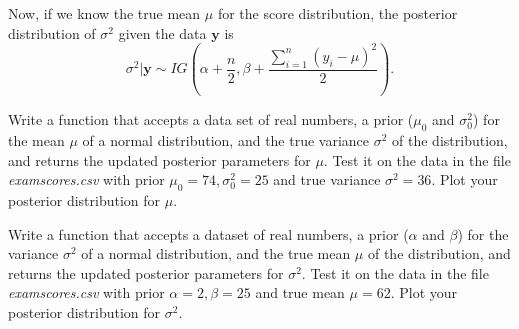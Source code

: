 Now, if we know the true mean $\mu$ for the score distribution, the posterior distribution of $\sigma^{2}$ given the data $\mathbf{y}$ is $$\sigma^{2} | \mathbf{y} \sim IG \left(\alpha + \frac{n}{2}, \beta + \frac{\sum_{i=1}^{n} (y_{i} - \mu)^{2}}{2}\right).$$

\begin{problem}
Write a function that accepts a data set of real numbers, a prior ($\mu_{0}$ and $\sigma_{0}^{2}$) for the mean $\mu$ of a normal distribution, and the true variance $\sigma^{2}$ of the distribution, and returns the updated posterior parameters for $\mu$. Test it on the data in the file \emph{examscores.csv} with prior $\mu_{0} = 74, \sigma_{0}^{2} = 25$ and true variance $\sigma^{2} = 36$. Plot your posterior distribution for $\mu$.
\end{problem}

\begin{problem}
Write a function that accepts a dataset of real numbers, a prior ($\alpha$ and $\beta$) for the variance $\sigma^{2}$ of a normal distribution, and the true mean $\mu$ of the distribution, and returns the updated posterior parameters for $\sigma^{2}$. Test it on the data in the file \emph{examscores.csv} with prior $\alpha=2, \beta = 25$ and true mean $\mu = 62$. Plot your posterior distribution for $\sigma^{2}$.
\end{problem}